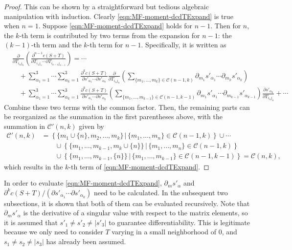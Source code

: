 \begin{proof}
	This can be shown by a straightforward but tedious algebraic manipulation with induction.
	Clearly \eqref{eqn:MF-moment-dcdTExpand} is true when $n=1$. 
	Suppose \eqref{eqn:MF-moment-dcdTExpand} holds for $n-1$.
	Then for $n$, the $k$-th term is contributed by two terms from the expansion for $n-1$: the $(k-1)$-th term and the $k$-th term for $n-1$.
	Specifically, it is written as
	\begin{align*}
		&\frac{\partial}{\partial T_{i_nj_n}} \left( \frac{\partial^{n-1} c(S+T)}{\partial T_{i_1j_1} \cdots \partial T_{i_{n-1}j_{n-1}}}\right) = \cdots \nonumber \\
		&\quad + \sum_{\alpha_1=1}^{3}\cdots\sum_{\alpha_k=1}^{3} \frac{\partial^k c(S+T)}{\partial s'_{\alpha_1} \cdots \partial s'_{\alpha_k}} \frac{\partial}{\partial T_{i_nj_n}}\left( \sum_{\{m_1,\ldots,m_k\}\in\mathcal{C}(n-1,k)} \partial_{m_1}s'_{\alpha_1} \cdots \partial_{m_k}s'_{\alpha_k} \right) \\
		&\quad + \sum_{\alpha_1=1}^{3}\cdots\sum_{\alpha_k=1}^{3} \frac{\partial^k c(S+T)}{\partial s'_{\alpha_1} \cdots \partial s'_{\alpha_k}} \left( \sum_{\{m_1,\ldots,m_{k-1}\}\in\mathcal{C}(n-1,k-1)} \partial_{m_1}s'_{\alpha_1} \cdots \partial_{m_{k-1}}s'_{\alpha_{k-1}} \right) \frac{\partial s'_{\alpha_k}}{\partial T_{i_nj_n}} + \cdots
	\end{align*}
	Combine these two terms with the common factor.
	Then, the remaining parts can be reorganized as the summation in the first parentheses above, with the summation in $\mathcal{C}'(n,k)$ given by
	\begin{align*}
		\mathcal{C}'(n,k) &= \left\{ \{m_1\cup\{n\},m_2,\ldots,m_k\} \,|\, \{m_1,\ldots,m_n\}\in\mathcal{C}(n-1,k) \right\} \cup \cdots \\
		&\qquad \cup \left\{ \{m_1,\ldots,m_{k-1},m_k\cup\{n\}\} \,|\, \{m_1,\ldots,m_n\}\in\mathcal{C}(n-1,k) \right\} \\
		&\qquad \cup \left\{ \{m_1,\ldots,m_{k-1},\{n\}\} \,|\, \{m_1,\ldots,m_{k-1}\}\in\mathcal{C}(n-1,k-1) \right\} = \mathcal{C}(n,k),
	\end{align*}
	which results in the $k$-th term of \eqref{eqn:MF-moment-dcdTExpand}.
\end{proof}

In order to evaluate \eqref{eqn:MF-moment-dcdTExpand}, $\partial_m s'_\alpha$ and $\partial^k c(S+T)/ (\partial s'_{\alpha_1} \cdots \partial s'_{\alpha_k})$ need to be calculated.
In the subsequent two subsections, it is shown that both of them can be evaluated recursively.
Note that $\partial_m s'_\alpha$ is the derivative of a singular value with respect to the matrix elements, so it is assumed that $s'_1 \neq s'_2 \neq |s'_3|$ to guarantee differentiability.
This is legitimate because we only need to consider $T$ varying in a small neighborhood of $0$, and $s_1 \neq s_2 \neq |s_3|$ has already been assumed.

